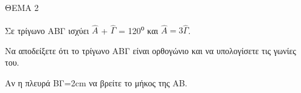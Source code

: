 
ΘΕΜΑ 2

Σε τρίγωνο ΑΒΓ ισχύει $\widehat{Α}$ + $\widehat{\Gamma}$ = 120\textsuperscript{ο} και $\widehat{Α} = 3\widehat{\Gamma}$.

\begin{alist}
\item Να αποδείξετε ότι το τρίγωνο ΑΒΓ είναι ορθογώνιο και να υπολογίσετε τις γωνίες του. 

\item Αν η πλευρά ΒΓ=2cm να βρείτε το μήκος της ΑΒ. 
\end{alist}
